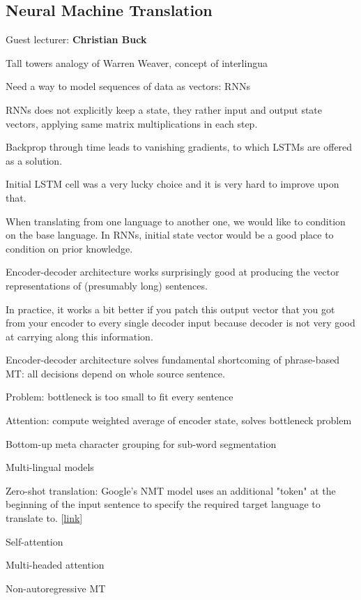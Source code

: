 \documentclass[12pt]{article}
\begin{document}
\subsection{Neural Machine Translation}
Guest lecturer: \textbf{Christian Buck}
\ulb
\item Tall towers analogy of Warren Weaver, concept of interlingua
\item Need a way to model sequences of data as vectors: RNNs
\item RNNs does not explicitly keep a state, they rather input and output state vectors, applying same matrix multiplications in each step.
\item Backprop through time leads to vanishing gradients, to which LSTMs are offered as a solution.
\item Initial LSTM cell was a very lucky choice and it is very hard to improve upon that.
\item When translating from one language to another one, we would like to condition on the base language. In RNNs, initial state vector would be a good place to condition on prior knowledge.
\item Encoder-decoder architecture works surprisingly good at producing the vector representations of (presumably long) sentences.
\item In practice, it works a bit better if you patch this output vector that you got from your encoder to every single decoder input because decoder is not very good at carrying along this information.
\item Encoder-decoder architecture solves fundamental shortcoming of phrase-based MT: all decisions depend on whole source sentence.
\item Problem: bottleneck is too small to fit every sentence
\item Attention: compute weighted average of encoder state, solves bottleneck problem
\item Bottom-up meta character grouping for sub-word segmentation
\item Multi-lingual models
\item Zero-shot translation: Google's NMT model uses an additional "token" at the beginning of the input sentence to specify the required target language to translate to. [\href{https://ai.googleblog.com/2016/11/zero-shot-translation-with-googles.html}{link}]
\item Self-attention
\item Multi-headed attention
\item Non-autoregressive MT
\ule
\end{document}
